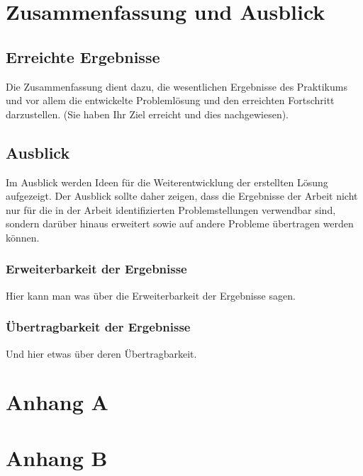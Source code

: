 \chapter{Zusammenfassung und Ausblick}
\label{cha:zusammenfassung}

\section{Erreichte Ergebnisse}
\label{sec:ergebnisse}

Die Zusammenfassung dient dazu, die wesentlichen Ergebnisse des 
Praktikums und vor allem die entwickelte Problemlösung und den 
erreichten Fortschritt darzustellen. (Sie haben Ihr Ziel erreicht und 
dies nachgewiesen).

\section{Ausblick}
\label{sec:ausblick}

Im Ausblick werden Ideen für die Weiterentwicklung der erstellten Lösung 
aufgezeigt. Der Ausblick sollte daher zeigen, dass die Ergebnisse der 
Arbeit nicht nur für die in der Arbeit identifizierten Problemstellungen 
verwendbar sind, sondern darüber hinaus erweitert sowie auf andere 
Probleme übertragen werden können.

\subsection{Erweiterbarkeit der Ergebnisse}
\label{sub:erweiterbarkeit}

Hier kann man was über die Erweiterbarkeit der Ergebnisse sagen.

\subsection{Übertragbarkeit der Ergebnisse}
\label{sub:uebertragbarkeit}

Und hier etwas über deren Übertragbarkeit.

\appendix

\printbibliography[heading=bibintoc]

\chapter{Anhang A}

\chapter{Anhang B}



